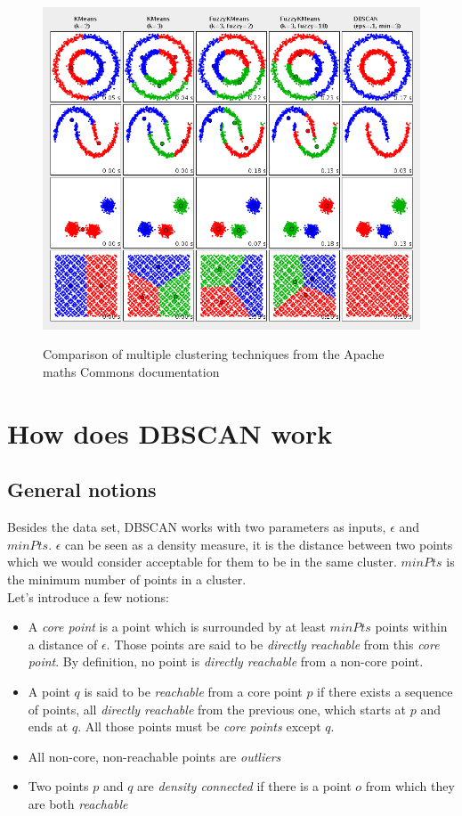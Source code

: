 \begin{figure}
\centering
{\includegraphics[width=6in]{images/cluster_comparison.png}}
\caption{Comparison of multiple clustering techniques from the Apache maths Commons documentation\cite{apachecluster}}
\label{fig:clustComp}
\end{figure}
\newcommand\minpts{\mathit{minPts}}
\section{How does DBSCAN work}
\subsection{General notions}
Besides the data set, DBSCAN works with two parameters as inputs, $\epsilon$ and $\minpts$. $\epsilon$ can be seen as a density measure, it is the distance between two points which we would consider acceptable for them to be in the same cluster. $\minpts$ is the minimum number of points in a cluster.\\
Let's introduce a few notions\cite{dbscan}:
\begin{itemize}
	\item A \emph{core point} is a point which is surrounded by at least $\minpts$ points within a distance of $\epsilon$. Those points are said to be \emph{directly reachable} from this \emph{core point}. By definition, no point is \emph{directly reachable} from a non-core point.
	\item A point $q$ is said to be \emph{reachable} from a core point $p$ if there exists a sequence of points, all \emph{directly reachable} from the previous one, which starts at $p$ and ends at $q$. All those points must be \emph{core points} except $q$.
	\item All non-core, non-reachable points are \emph{outliers}
	\item Two points $p$ and $q$ are \emph{density connected} if there is a point $o$ from which they are both \emph{reachable}
\end{itemize}

